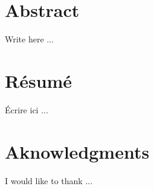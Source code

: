 \chapter*{Abstract}
Write here ...
\chapter*{Résumé}
Écrire ici ...
\chapter*{Aknowledgments}
I would like to thank ...
